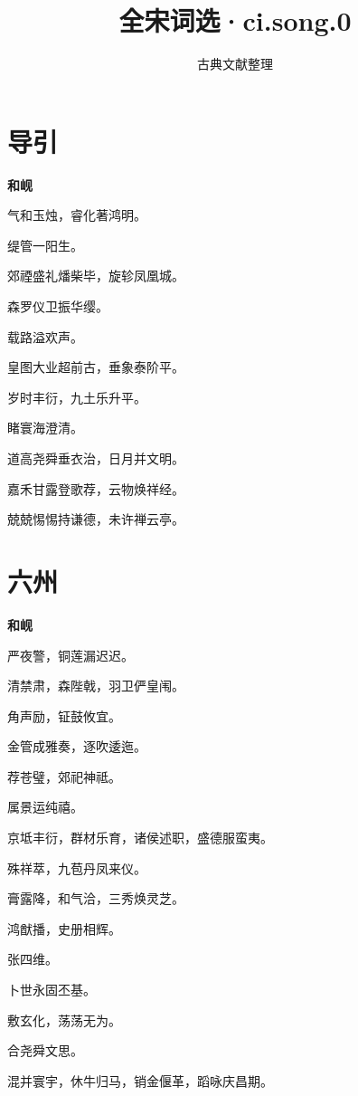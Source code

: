 \documentclass[12pt,a4paper]{ctexbook}
\title{全宋词选·ci.song.0}
\author{古典文献整理}
\date{}
\begin{document}
\maketitle
\tableofcontents
\newpage
\section{导引}
\textbf{和岘}\par\vspace{0.5em}
气和玉烛，睿化著鸿明。\par
缇管一阳生。\par
郊禋盛礼燔柴毕，旋轸凤凰城。\par
森罗仪卫振华缨。\par
载路溢欢声。\par
皇图大业超前古，垂象泰阶平。\par
岁时丰衍，九土乐升平。\par
睹寰海澄清。\par
道高尧舜垂衣治，日月并文明。\par
嘉禾甘露登歌荐，云物焕祥经。\par
兢兢惕惕持谦德，未许禅云亭。\par

\section{六州}
\textbf{和岘}\par\vspace{0.5em}
严夜警，铜莲漏迟迟。\par
清禁肃，森陛戟，羽卫俨皇闱。\par
角声励，钲鼓攸宜。\par
金管成雅奏，逐吹逶迤。\par
荐苍璧，郊祀神祗。\par
属景运纯禧。\par
京坻丰衍，群材乐育，诸侯述职，盛德服蛮夷。\par
殊祥萃，九苞丹凤来仪。\par
膏露降，和气洽，三秀焕灵芝。\par
鸿猷播，史册相辉。\par
张四维。\par
卜世永固丕基。\par
敷玄化，荡荡无为。\par
合尧舜文思。\par
混并寰宇，休牛归马，销金偃革，蹈咏庆昌期。\par
\end{document}
